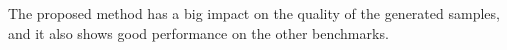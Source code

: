 The proposed method has a big impact on the quality of the generated samples, and it also shows good performance on the other benchmarks.
